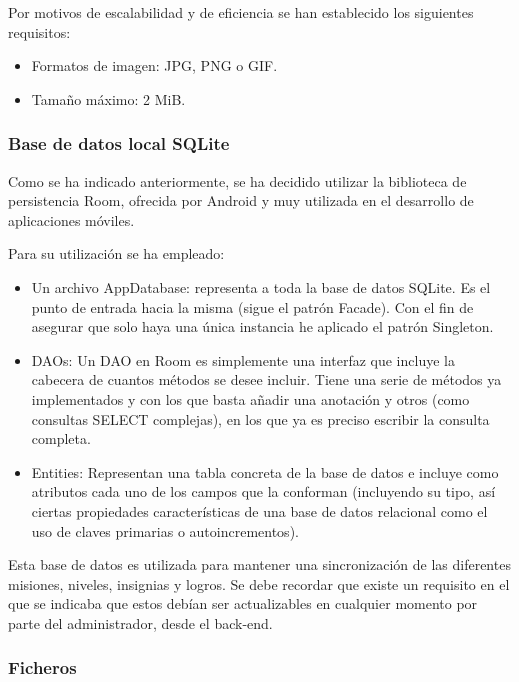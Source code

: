 \documentclass[twoside]{report}
\begin{document}
Por motivos de escalabilidad y de eficiencia se han establecido los siguientes requisitos:
\begin{itemize}
\item Formatos de imagen: JPG, PNG o GIF.
\item Tamaño máximo: 2 MiB.
\end{itemize}

\subsubsection{Base de datos local SQLite}

Como se ha indicado anteriormente, se ha decidido utilizar la biblioteca de persistencia Room, ofrecida por Android y muy utilizada en el desarrollo de aplicaciones móviles.

Para su utilización se ha empleado:

\begin{itemize}

\item Un archivo AppDatabase: representa a toda la base de datos SQLite. Es el punto de entrada hacia la misma (sigue el patrón Facade). Con el fin de asegurar que solo haya una única instancia he aplicado el patrón Singleton.

\item DAOs: Un DAO en Room es simplemente una interfaz que incluye la cabecera de cuantos métodos se desee incluir. Tiene una serie de métodos ya implementados y con los que basta añadir una anotación y otros (como consultas SELECT complejas), en los que ya es preciso escribir la consulta completa.

\item Entities: Representan una tabla concreta de la base de datos e incluye como atributos cada uno de los campos que la conforman (incluyendo su tipo, así ciertas propiedades características de una base de datos relacional como el uso de claves primarias o autoincrementos).


\end{itemize}

Esta base de datos es utilizada para mantener una sincronización de las diferentes misiones, niveles, insignias y logros. Se debe recordar que existe un requisito en el que se indicaba que estos debían ser actualizables en cualquier momento por parte del administrador, desde el back-end.

\subsubsection{Ficheros}
\end{document}
